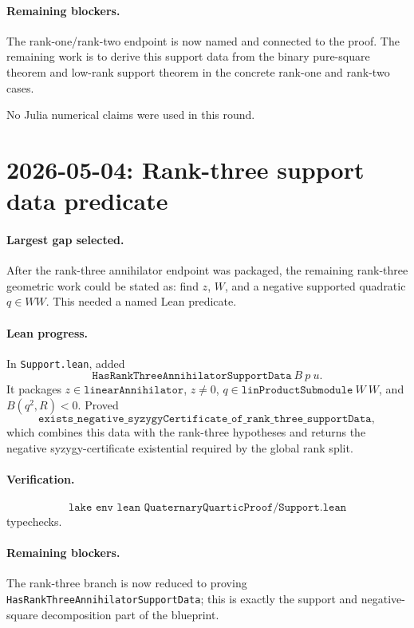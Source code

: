 \documentclass[11pt]{article}
\begin{document}
\paragraph{Remaining blockers.}
The rank-one/rank-two endpoint is now named and connected to the proof.  The
remaining work is to derive this support data from the binary pure-square
theorem and low-rank support theorem in the concrete rank-one and rank-two
cases.

No Julia numerical claims were used in this round.

\section*{2026-05-04: Rank-three support data predicate}

\paragraph{Largest gap selected.}
After the rank-three annihilator endpoint was packaged, the remaining
rank-three geometric work could be stated as: find \(z\), \(W\), and a
negative supported quadratic \(q\in WW\).  This needed a named Lean predicate.

\paragraph{Lean progress.}
In \texttt{Support.lean}, added
\[
\texttt{HasRankThreeAnnihilatorSupportData}\ B\ p\ u.
\]
It packages \(z\in\texttt{linearAnnihilator}\), \(z\neq0\),
\(q\in\texttt{linProductSubmodule}\ W\ W\), and \(B(q^2,R)<0\).  Proved
\[
\texttt{exists\_negative\_syzygyCertificate\_of\_rank\_three\_supportData},
\]
which combines this data with the rank-three hypotheses and returns the
negative syzygy-certificate existential required by the global rank split.

\paragraph{Verification.}
\[
\texttt{lake env lean QuaternaryQuarticProof/Support.lean}
\]
typechecks.

\paragraph{Remaining blockers.}
The rank-three branch is now reduced to proving
\texttt{HasRankThreeAnnihilatorSupportData}; this is exactly the support and
negative-square decomposition part of the blueprint.
\end{document}
